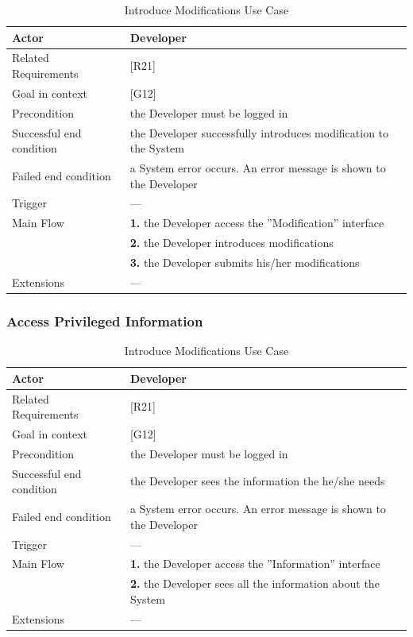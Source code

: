 \begin{table}[htbp]
\begin{center}
\begin{tabular}[t]{p{}p{}}

\hline
Actor & Developer \\
\hline
Related Requirements & [R21] \\
\hline
Goal in context & [G12] \\
\hline
Precondition & the Developer must be logged in \\
\hline
Successful end condition & the Developer successfully introduces modification to the System \\
\hline
Failed end condition & a System error occurs. An error message is shown to the Developer  \\
\hline
Trigger & --- \\
\hline
Main Flow & \textbf{1.} the Developer access the ''Modification'' interface \\
& \textbf{2.} the Developer introduces modifications \\
& \textbf{3.} the Developer submits his/her modifications \\
\hline
Extensions & --- \\
\hline

\end{tabular}
\end{center}
\caption{Introduce Modifications Use Case}
\end{table}
\clearpage

\subsubsection{Access Privileged Information}

\begin{table}[htbp]
\begin{center}
\begin{tabular}[t]{p{}p{}}

\hline
Actor & Developer \\
\hline
Related Requirements & [R21] \\
\hline
Goal in context & [G12] \\
\hline
Precondition & the Developer must be logged in \\
\hline
Successful end condition & the Developer sees the information the he/she needs \\
\hline
Failed end condition & a System error occurs. An error message is shown to the Developer  \\
\hline
Trigger & --- \\
\hline
Main Flow & \textbf{1.} the Developer access the ''Information'' interface \\
& \textbf{2.} the Developer sees all the information about the System \\
\hline
Extensions & --- \\
\hline

\end{tabular}
\end{center}
\caption{Introduce Modifications Use Case}
\end{table}
\clearpage

